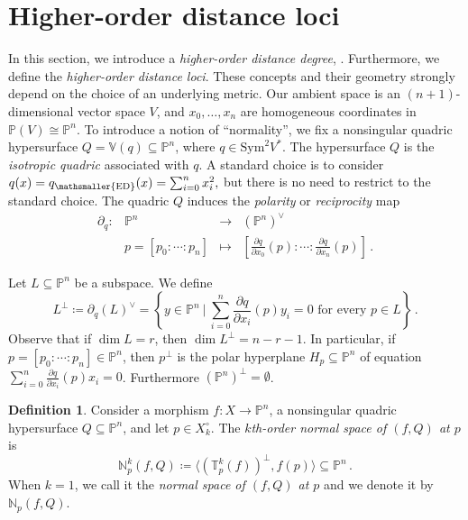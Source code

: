\documentclass[11pt,reqno]{amsart}
\numberwithin{equation}{section}
\theoremstyle{plain}
\numberwithin{theorem}{section}
\theoremstyle{definition}
\newtheorem{definition}[theorem]{Definition}
\newcommand{\N}{\mathbb{N}}
\renewcommand{\P}{\mathbb{P}}
\newcommand{\T}{\mathbb{T}}
\newcommand{\V}{\mathbb{V}}
\newcommand{\mED}{\mathsmaller{\mathrm{ED}}}
\begin{document}
   













\section{Higher-order distance loci}\label{sec: higher-order normal bundles}
In this section, we introduce a {\em higher-order distance degree}, \cite{DHOST}. Furthermore, we define the {\em higher-order distance loci}. These concepts and their geometry strongly depend on the choice of an underlying metric. Our ambient space is an $(n+1)$-dimensional vector space $V$, and $x_0,\dots,x_n$ are homogeneous coordinates in $\P(V)\cong\P^n$. To introduce a notion of ``normality'', we fix a nonsingular quadric hypersurface $Q=\V(q)\subseteq\P^n$, where $q\in\mathrm{Sym}^2V^*$. The hypersurface $Q$ is the {\em isotropic quadric} associated with $q$. A standard choice is to consider $q(x) = q_\mED(x) = \sum_{i=0}^n x_i^2,$ but there is no need to restrict to the standard choice.
The quadric $Q$ induces the {\em polarity} or {\em reciprocity} map
\begin{equation}\label{eq: polarity}
\begin{matrix}
    \partial_q\colon & \P^n & \longrightarrow & (\P^n)^\vee\\
    & p=[p_0:\cdots:p_n] & \longmapsto & \left[\frac{\partial q}{\partial x_0}(p):\cdots:\frac{\partial q}{\partial x_n}(p)\right]\,.
\end{matrix}
\end{equation}

Let $L\subseteq\P^n$ be a subspace. We define
\begin{equation}\label{eq: perp}
    L^\perp \coloneqq \partial_q(L)^\vee = \left\{y\in\P^n\ \bigg|\ \text{$\sum_{i=0}^n\frac{\partial q}{\partial x_i}(p)y_i=0$ for every $p\in L$}\right\}\,.
\end{equation}
Observe that if $\dim L=r$, then $\dim L^\perp=n-r-1$. In particular, if $p=[p_0:\cdots:p_n]\in\P^n$, then $p^\perp$ is the polar hyperplane $H_p\subseteq\P^n$ of equation $\sum_{i=0}^n\frac{\partial q}{\partial x_i}(p)x_i=0$. Furthermore $(\P^n)^\perp=\emptyset$.

\begin{definition}\cite{piene2022higher}\label{def: kth order normal space}
Consider a morphism $f\colon X\to\P^n$, a nonsingular quadric hypersurface $Q\subseteq\P^n$, and let 
$p\in X_k^{\circ}.$ The {\em $k$th-order normal space of $(f,Q)$ at $p$} is 
\[
    \N_p^k(f,Q) \coloneqq \langle(\T_p^k(f))^\perp,f(p)\rangle \subseteq \P^n\,.
\]
When $k=1$, we call it the {\em normal space of $(f,Q)$ at $p$} and we denote it by $\N_p(f,Q)$.
\end{definition}
\end{document}
